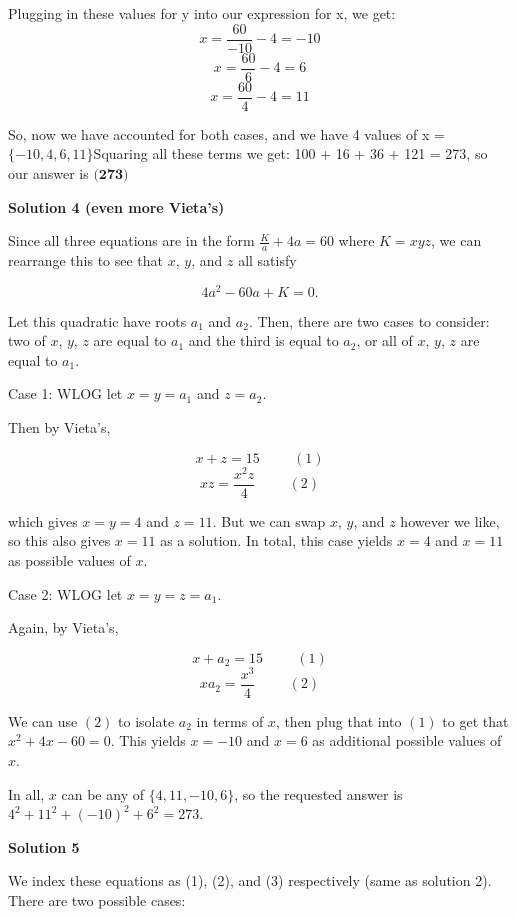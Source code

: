 \begin{enumerate}
 Plugging in these values for y into our expression for x, we get:
 \[x = \frac{60}{-10} - 4 = -10\] 
 \[x = \frac{60}{6} - 4 = 6\] 
 \[x = \frac{60}{4} - 4 = 11\] 

 So, now we have accounted for both cases, and we have 4 values of x = $\{-10,4,6,11\}$Squaring all these terms we get: 100 + 16 + 36 + 121 = 273, so our answer is $\boxed{\textbf{(273)}}$




\textbf{Solution 4 (even more Vieta's)}

Since all three equations are in the form $\frac{K}{a} + 4a = 60$ where $K = xyz$, we can rearrange this to see that $x$, $y$, and $z$ all satisfy 

 
 \[ 4a^2 - 60a + K = 0. \]

 Let this quadratic have roots $a_1$ and $a_2$. Then, there are two cases to consider: two of $x$, $y$, $z$ are equal to $a_1$ and the third is equal to $a_2$, or all of $x$, $y$, $z$ are equal to $a_1$.

 Case 1: WLOG let $x = y = a_1$ and $z = a_2$.

 Then by Vieta's,

 
 \[x + z = 15 \hspace{1cm} (1)\]
 \[xz = \frac{x^2z}{4} \hspace{1cm} (2)\]

 which gives $x = y = 4$ and $z = 11$. But we can swap $x$, $y$, and $z$ however we like, so this also gives $x = 11$ as a solution. In total, this case yields $x = 4$ and $x = 11$ as possible values of $x$.

 Case 2: WLOG let $x = y = z = a_1$.

 Again, by Vieta's,

 
 \[x + a_2 = 15 \hspace{1cm} (1)\]
 \[xa_2 = \frac{x^3}{4} \hspace{1cm} (2)\]

 We can use $(2)$ to isolate $a_2$ in terms of $x$, then plug that into $(1)$ to get that $x^2 + 4x - 60 = 0$. This yields $x = -10$ and $x = 6$ as additional possible values of $x$.

 In all, $x$ can be any of $\{ 4, 11, -10, 6 \}$, so the requested answer is $4^2 + 11^2 + (-10)^2 + 6^2 = \boxed{273}.$




\textbf{Solution 5}

We index these equations as (1), (2), and (3) respectively (same as solution 2). There are two possible cases:


\end{enumerate}
